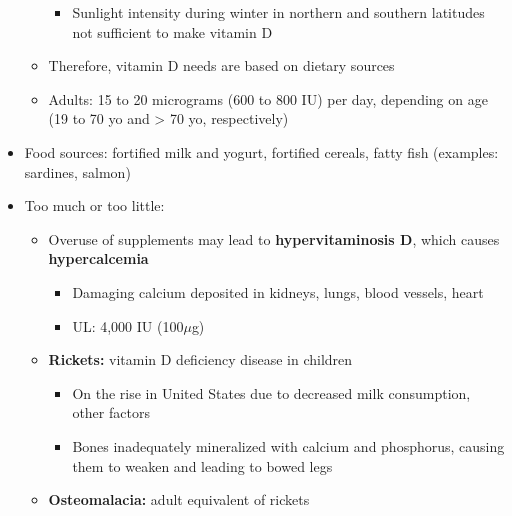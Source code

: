 \documentclass[12pt]{article}
\begin{document}
\begin{itemize}
\begin{itemize}
\begin{itemize}
                                \item Sunlight intensity during winter in northern and southern latitudes not sufficient to make vitamin D
                            \end{itemize}
                        \item Therefore, vitamin D needs are based on dietary sources
                        \item Adults: 15 to 20 micrograms (600 to 800 IU) per day, depending on age (19 to 70 yo and > 70 yo, respectively)
                    \end{itemize}
                \item Food sources: fortified milk and yogurt, fortified cereals, fatty fish (examples: sardines, salmon)
                \item Too much or too little:
                    \begin{itemize}
                        \item Overuse of supplements may lead to \textbf{hypervitaminosis D}, which causes \textbf{hypercalcemia}
                            \begin{itemize}
                                \item Damaging calcium deposited in kidneys, lungs, blood vessels, heart
                                \item UL: 4,000 IU (100$\mu$g)
                            \end{itemize}
                        \item \textbf{Rickets:} vitamin D deficiency disease in children
                            \begin{itemize}
                                \item On the rise in United States due to decreased milk consumption, other factors
                                \item Bones inadequately mineralized with calcium and phosphorus, causing them to weaken and leading to bowed legs
                            \end{itemize}
                        \item \textbf{Osteomalacia:} adult equivalent of rickets
                    \end{itemize}
            \end{itemize}
\end{document}
